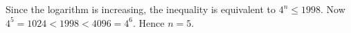Since the logarithm is increasing, the inequality is equivalent to $4^n\le1998$. Now $4^5=1024<1998<4096=4^6$. Hence $\boxed{n=5}$.
